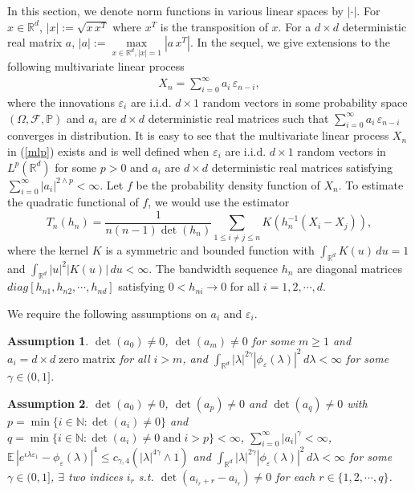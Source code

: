\documentclass[11pt]{article}
\newtheorem{assumption}{Assumption}
\def\R{{\mathbb R}}
\def\E{{{\mathbb E}\,}}
\def\P{{\mathbb P}}
\def\N{{\mathbb N}}
\begin{document}
In this section, we denote norm functions in various linear spaces by $|\cdot|$. For $x\in\R^d$, $|x|:=\sqrt{x\, x^T}$ where $x^T$ is the transposition of $x$. For a $d\times d$ deterministic real matrix $a$, $|a|:=\max\limits_{x\in\R^d, |x|=1} |a\, x^T|$. In the sequel, we give extensions to the following multivariate linear process
\begin{align}\label{mlp}
X_n=\sum\limits_{i=0}^\infty a_i\, \varepsilon_{n-i},
\end{align}
where the innovations $\varepsilon_i$ are i.i.d. $d\times 1$ random vectors in some probability space $(\Omega, \mathcal{F}, \P)$ and $a_i$ are $d\times d$ deterministic real matrices such that $\sum\limits_{i=0}^\infty a_i\, \varepsilon_{n-i}$ converges in distribution. It is easy to see that the multivariate linear process $X_n$ in (\ref{mlp}) exists and is well defined when $\varepsilon_i$ are i.i.d. $d\times 1$ random vectors in $L^p(\R^d)$ for some $p>0$ and $a_i$ are $d\times d$ deterministic real matrices satisfying $\sum\limits^{\infty}_{i=0}|a_i|^{2\wedge p}<\infty$.  Let $f$ be the probability density function of $X_n$. To estimate the quadratic functional of $f$, we would use the estimator
\[ 
T_n(h_n)=\frac{1}{n(n-1)\det(h_n)} \sum_{1\le i\neq j\le n}K\left(h^{-1}_n(X_i-X_j)\right),
\]
where the kernel $K$ is a symmetric and bounded function with $\int_{\R^d} K(u)\, du = 1$ and $\int_{\R^d} |u|^2|K(u)|\, du<\infty$. The bandwidth sequence $h_n$ are diagonal matrices $diag[h_{n1}, h_{n2}, \cdots, h_{nd}]$ satisfying $0<h_{ni}\to 0$ for all $i=1,2,\cdots, d$.  

We require the following assumptions on $a_i$ and $\varepsilon_i$.
\begin{assumption} \label{ass1}
$\det(a_0)\neq 0$, $\det(a_m)\neq 0$ for some $m\geq 1$ and $a_i=d\times d\; \text{zero matrix}$ for all $i>m$, and  $\int_{\R^d}|\lambda|^{2\gamma} |\phi_{\varepsilon}(\lambda)|^2\, d\lambda<\infty$ for some $\gamma\in(0,1]$.
\end{assumption}

\begin{assumption} \label{ass2}
$\det(a_0)\neq 0$, $\det(a_p)\neq 0$ and $\det(a_q)\neq 0$ with $p=\min\{i\in\N: \det(a_i)\neq 0\}$ and $q=\min\{i\in\N: \det(a_i)\neq 0\; \text{and}\; i>p\}<\infty$, $\sum\limits^{\infty}_{i=0} |a_i|^{\gamma}<\infty$, $\E|e^{\iota \lambda \varepsilon_1}-\phi_{\varepsilon}(\lambda)|^{4}\leq c_{\gamma,4} \left(|\lambda|^{4\gamma}\wedge 1\right)$ and $\int_{\R^d}|\lambda|^{2\gamma} |\phi_{\varepsilon}(\lambda)|^2\, d\lambda<\infty$ for some $\gamma\in(0,1]$, $\exists$ two indices $i_r$ s.t. $\det(a_{i_r+r}-a_{i_r})\neq 0$ for each $r\in\{1,2,\cdots, q\}$.
\end{assumption}
\end{document}
